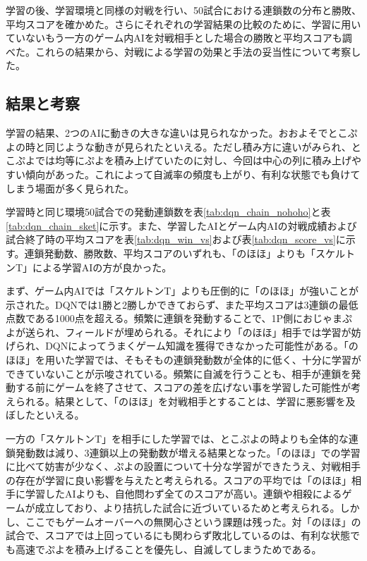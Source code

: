 \documentclass[12pt]{jarticle}
\begin{document}
学習の後、学習環境と同様の対戦を行い、50試合における連鎖数の分布と勝敗、平均スコアを確かめた。さらにそれぞれの学習結果の比較のために、学習に用いていないもう一方のゲーム内AIを対戦相手とした場合の勝敗と平均スコアも調べた。これらの結果から、対戦による学習の効果と手法の妥当性について考察した。

\subsection{結果と考察}
学習の結果、2つのAIに動きの大きな違いは見られなかった。おおよそでとこぷよの時と同じような動きが見られたといえる。ただし積み方に違いがみられ、とこぷよでは均等にぷよを積み上げていたのに対し、今回は中心の列に積み上げやすい傾向があった。これによって自滅率の頻度も上がり、有利な状態でも負けてしまう場面が多く見られた。

学習時と同じ環境50試合での発動連鎖数を表\ref{tab:dqn_chain_nohoho}と表\ref{tab:dqn_chain_sket}に示す。また、学習したAIとゲーム内AIの対戦成績および試合終了時の平均スコアを表\ref{tab:dqn_win_vs}および表\ref{tab:dqn_score_vs}に示す。連鎖発動数、勝敗数、平均スコアのいずれも、「のほほ」よりも「スケルトンT」による学習AIの方が良かった。

まず、ゲーム内AIでは「スケルトンT」よりも圧倒的に「のほほ」が強いことが示された。DQNでは1勝と2勝しかできておらず、また平均スコアは3連鎖の最低点数である1000点を超える。頻繁に連鎖を発動することで、1P側におじゃまぷよが送られ、フィールドが埋められる。それにより「のほほ」相手では学習が妨げられ、DQNによってうまくゲーム知識を獲得できなかった可能性がある。「のほほ」を用いた学習では、そもそもの連鎖発動数が全体的に低く、十分に学習ができていないことが示唆されている。頻繁に自滅を行うことも、相手が連鎖を発動する前にゲームを終了させて、スコアの差を広げない事を学習した可能性が考えられる。結果として、「のほほ」を対戦相手とすることは、学習に悪影響を及ぼしたといえる。

一方の「スケルトンT」を相手にした学習では、とこぷよの時よりも全体的な連鎖発動数は減り、3連鎖以上の発動数が増える結果となった。「のほほ」での学習に比べて妨害が少なく、ぷよの設置について十分な学習ができたうえ、対戦相手の存在が学習に良い影響を与えたと考えられる。スコアの平均では「のほほ」相手に学習したAIよりも、自他問わず全てのスコアが高い。連鎖や相殺によるゲームが成立しており、より拮抗した試合に近づいているためと考えられる。しかし、ここでもゲームオーバーへの無関心さという課題は残った。対「のほほ」の試合で、スコアでは上回っているにも関わらず敗北しているのは、有利な状態でも高速でぷよを積み上げることを優先し、自滅してしまうためである。
\end{document}
